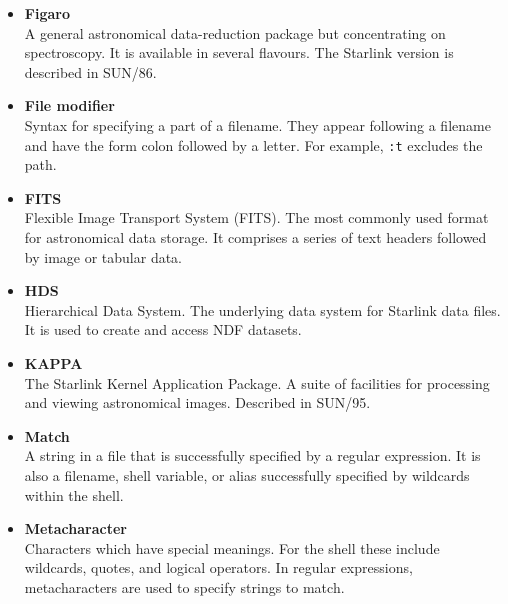 \documentclass[twoside,11pt]{article}
\newcommand{\htmladdnormallink}[2]{#1}
\newcommand{\htmlref}[2]{#1}
\newcommand{\xref}[3]{#1}
\newcommand{\FITSref}{\htmladdnormallink{FITS}{http://fits.gsfc.nasa.gov/fits\_{}home.html}}
\begin{document}
\begin{itemize}
\item {\bf\label{sc4_gl_figaro}Figaro}\\
      A general astronomical data-reduction package but concentrating
      on spectroscopy.  It is available in several flavours.  The Starlink
      version is described in \xref{SUN/86}{sun86}{}.

\item {\bf\label{sc4_gl_filmod}File modifier}\\
      Syntax for specifying a part of a filename.  They appear following
      a filename and have the form colon followed by a letter.  For
      example, {\tt :t} excludes the path.

\item {\bf\label{sc4_gl_fits}FITS}\\
      Flexible Image Transport System (\FITSref).  The most commonly used 
      format for astronomical data storage.  It comprises a series of
      text headers followed by image or tabular data. 

\item {\bf\label{sc4_gl_hds}HDS}\\
      Hierarchical Data System.  The underlying data system for Starlink
      data files.  It is used to create and access \htmlref{NDF}{sc4_gl_ndf}
      datasets.

\item {\bf\label{sc4_gl_kappa}KAPPA}\\
      The Starlink Kernel Application Package.  A suite of facilities
      for processing and viewing astronomical images.
      Described in \xref{SUN/95}{sun95}{}.

\item {\bf\label{sc4_gl_match}Match}\\
      A string in a file that is successfully specified by a 
      \htmlref{regular expression}{sc4_gl_reg_exp}.  It is also
      a filename, \htmlref{shell variable}{sc4_gl_she_var}, or
      \htmlref{alias}{sc4_gl_alias} successfully specified by
      \htmlref{wildcards}{sc4_gl_wild} within the shell.

\item {\bf\label{sc4_gl_met}Metacharacter}\\
      Characters which have special meanings.  For the shell these
      include \htmlref{wildcards}{sc4_gl_wild}, quotes, and logical
      operators.  In \htmlref{regular expressions}{sc4_gl_reg_exp},
      metacharacters are used to specify strings to match.


\end{itemize}
\end{document}
